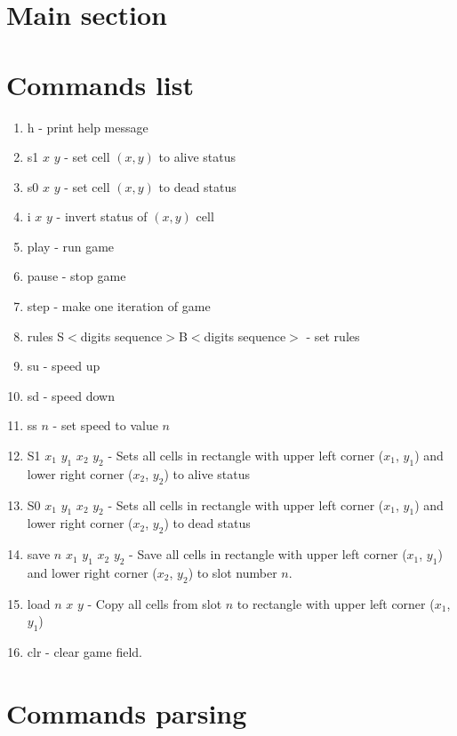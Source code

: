 \section*{Main section}

\section*{Commands list}

\begin{enumerate}
	\item \textsf{h} - print help message
	\item \textsf{s1 $x$ $y$} - set cell $(x, y)$ to alive status
	\item \textsf{s0 $x$ $y$} - set cell $(x, y)$ to dead status
	\item \textsf{i $x$ $y$} - invert status of $(x, y)$ cell
	\item \textsf{play} - run game
	\item \textsf{pause} - stop game
	\item \textsf{step} - make one iteration of game
	\item \textsf{rules S$<$digits sequence$>$B$<$digits sequence$>$} - set rules
	\item \textsf{su} - speed up
	\item \textsf{sd} - speed down
	\item \textsf{ss $n$} - set speed to value $n$
	\item \textsf{S1 $x_{1}$ $y_{1}$ $x_{2}$ $y_{2}$} -  Sets all cells in rectangle with upper left corner ($x_{1}$, $y_{1}$) and lower right corner ($x_{2}$, $y_{2}$) to alive status
	\item \textsf{S0 $x_{1}$ $y_{1}$ $x_{2}$ $y_{2}$} -  Sets all cells in rectangle with upper left corner ($x_{1}$, $y_{1}$) and lower right corner ($x_{2}$, $y_{2}$) to dead status
	\item \textsf{save $n$ $x_{1}$ $y_{1}$ $x_{2}$ $y_{2}$} - Save all cells in rectangle with upper left corner ($x_{1}$, $y_{1}$) and lower right corner ($x_{2}$, $y_{2}$) to slot number $n$.
	\item \textsf{load $n$ $x$ $y$} - Copy all cells from slot $n$ to rectangle with upper left corner ($x_{1}$, $y_{1}$)
	\item \textsf{clr} - clear game field.
\end{enumerate}

\section*{Commands parsing}

